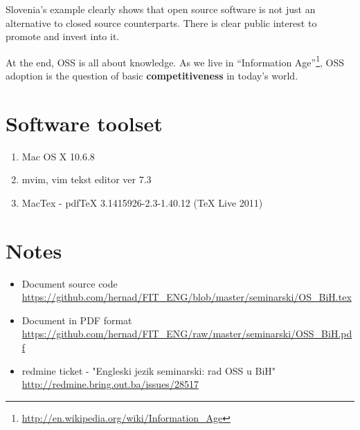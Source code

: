 \documentclass[times, utf8, seminar]{fit}
\begin{document}
Slovenia's example clearly shows that open source software is not just an alternative to closed source counterparts. There is clear public interest to promote and invest into it. 

At the end, OSS is all about knowledge. As we live in ``Information Age''\footnote{\url{http://en.wikipedia.org/wiki/Information\_Age}}, OSS adoption is the question of basic \textbf{competitiveness} in today's world. 




\appendix

\chapter{Software toolset}
\begin{enumerate}
  \item Mac OS X 10.6.8
  \item mvim, vim tekst editor ver 7.3
  \item MacTex - pdfTeX 3.1415926-2.3-1.40.12 (TeX Live 2011)
\end{enumerate}

\chapter{Notes}

\begin{itemize}
  \item Document source code \url{https://github.com/hernad/FIT\_ENG/blob/master/seminarski/OS\_BiH.tex}
  \item Document in PDF format \url{https://github.com/hernad/FIT\_ENG/raw/master/seminarski/OSS\_BiH.pdf}
  \item redmine ticket - "Engleski jezik seminarski: rad OSS u BiH" \url{http://redmine.bring.out.ba/issues/28517}

\end{itemize}
\end{document}
